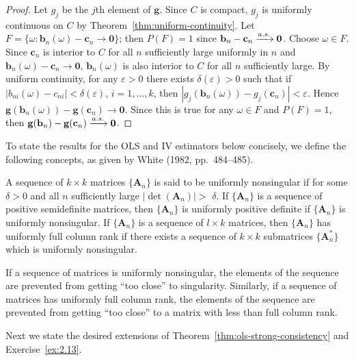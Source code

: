 \begin{proof}
Let $g_j$ be the $j$th element of $\mathbf{g}$. Since $C$ is compact, $g_j$ is uniformly
continuous on $C$ by Theorem~\ref{thm:uniform-continuity}. Let $F = \{\omega : \mathbf{b}_n(\omega) - \mathbf{c}_n \to \mathbf{0}\}$; then
$P(F) = 1$ since $\mathbf{b}_n - \mathbf{c}_n \xrightarrow{a.s.} \mathbf{0}$. Choose $\omega \in F$. Since $\mathbf{c}_n$ is interior to $C$
for all $n$ sufficiently large uniformly in $n$ and $\mathbf{b}_n(\omega) - \mathbf{c}_n \to \mathbf{0}$, $\mathbf{b}_n(\omega)$ is
also interior to $C$ for all $n$ sufficiently large. By uniform continuity, for any
$\varepsilon > 0$ there exists $\delta(\varepsilon) > 0$ such that if $|b_{ni}(\omega) - c_{ni}| < \delta(\varepsilon)$, $i = 1, \ldots, k$,
then $|g_j(\mathbf{b}_n(\omega)) - g_j(\mathbf{c}_n)| < \varepsilon$. Hence $\mathbf{g}(\mathbf{b}_n(\omega)) - \mathbf{g}(\mathbf{c}_n) \to \mathbf{0}$. Since this is
true for any $\omega \in F$ and $P(F) = 1$, then $\mathbf{g}(\mathbf{b}_n) - \mathbf{g}(\mathbf{c}_n) \xrightarrow{a.s.} \mathbf{0}$.
\end{proof}

To state the results for the OLS and IV estimators below concisely, we
define the following concepts, as given by White (1982, pp.~484--485).

\begin{definition}\label{def:uniformly-nonsingular}
A sequence of $k \times k$ matrices $\{\mathbf{A}_n\}$ is said to be uniformly
nonsingular if for some $\delta > 0$ and all $n$ sufficiently large $|\det(\mathbf{A}_n)| >$
$\delta$. If $\{\mathbf{A}_n\}$ is a sequence of positive semidefinite matrices, then $\{\mathbf{A}_n\}$ is
uniformly positive definite if $\{\mathbf{A}_n\}$ is uniformly nonsingular. If $\{\mathbf{A}_n\}$ is
a sequence of $l \times k$ matrices, then $\{\mathbf{A}_n\}$ has uniformly full column rank
if there exists a sequence of $k \times k$ submatrices $\{\mathbf{A}_n^*\}$ which is uniformly
nonsingular.
\end{definition}

If a sequence of matrices is uniformly nonsingular, the elements of the
sequence are prevented from getting ``too close'' to singularity. Similarly, if
a sequence of matrices has uniformly full column rank, the elements of the
sequence are prevented from getting ``too close'' to a matrix with less than
full column rank.

Next we state the desired extensions of Theorem~\ref{thm:ols-strong-consistency} and Exercise~\ref{ex:2.13}.

